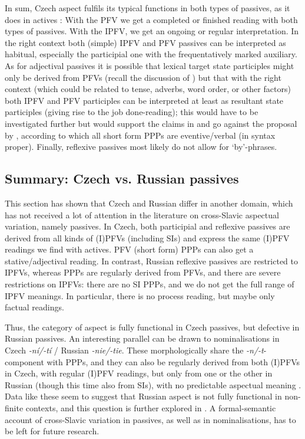 \documentclass[output=paper,colorlinks,citecolor=brown]{langscibook}
\begin{document}
In sum, Czech aspect fulfils its typical functions in both types of passives, as it does in actives%
: With the PFV we get a completed or finished reading with both types of passives. With the IPFV, we get an ongoing or regular interpretation. In the right context both (simple) IPFV and PFV passives can be interpreted as habitual, especially the participial one with the frequentatively marked auxiliary. As for adjectival passives it is possible that lexical target state participles might only be derived from PFVs (recall the discussion of ) but that with the right context (which could be related to tense, adverbs, word order, or other factors) both IPFV and PFV participles can be interpreted at least as resultant state participles (giving rise to the job done-reading); this would have to be investigated further but would support the claims in \citet{cahamedova20} and go against the proposal by \citet{veselovskakarlik}, according to which all short form PPPs are eventive/verbal (in syntax proper). Finally, reflexive passives most likely do not allow for `by'-phrases. 

\subsection{Summary: Czech vs. Russian passives}

This section has shown that Czech and Russian differ in another domain, which has not received a lot of attention in the literature on cross-Slavic aspectual variation, namely passives. In Czech, both participial and reflexive passives are derived from all kinds of (I)PFVs (including SIs) and express the same (I)PFV readings we find with actives. PFV (short form) PPPs can also get a stative/adjectival reading. In contrast, Russian reflexive passives are restricted to IPFVs, whereas PPPs are regularly derived from PFVs, and there are severe restrictions on IPFVs: there are no SI PPPs, and we do not get the full range of IPFV meanings. In particular, there is no process reading, but maybe only factual readings. 

Thus, the category of aspect is fully functional in Czech passives, but defective in Russian passives. An interesting parallel can be drawn to nominalisations in Czech \textit{-ní/-tí} / Russian \textit{-nie/-tie}. These morphologically share the \textit{-n/-t}-component with PPPs, and they can also be regularly derived from both (I)PFVs in Czech, with regular (I)PFV readings, but only from one or the other in Russian (though this time also from SIs), with no predictable aspectual meaning \citep[see, e.g.,][]{Dickey2000,biskup23adv}. Data like these seem to suggest that Russian aspect is not fully functional in non-finite contexts, and this question is further explored in \citet{gehrkeadv23}. A formal-semantic account of cross-Slavic variation in passives, as well as in nominalisations, has to be left for future research.
\end{document}
